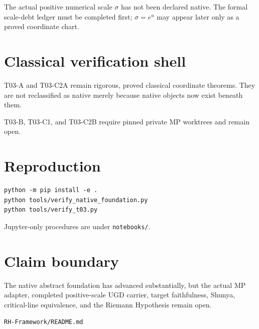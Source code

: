 The actual positive numerical scale \(\sigma\) has not been declared native.
The formal scale-debt ledger must be completed first; \(\sigma=e^u\) may appear
later only as a proved coordinate chart.

\hypertarget{classical-verification-shell}{%
\section{Classical verification shell}\label{classical-verification-shell}}

T03-A and T03-C2A remain rigorous, proved classical coordinate theorems. They
are not reclassified as native merely because native objects now exist beneath
them.

T03-B, T03-C1, and T03-C2B require pinned private MP worktrees and remain open.

\hypertarget{reproduction}{%
\section{Reproduction}\label{reproduction}}

\begin{verbatim}
python -m pip install -e .
python tools/verify_native_foundation.py
python tools/verify_t03.py
\end{verbatim}

Jupyter-only procedures are under \texttt{notebooks/}.

\hypertarget{claim-boundary}{%
\section{Claim boundary}\label{claim-boundary}}

The native abstract foundation has advanced substantially, but the actual MP
adapter, completed positive-scale UGD carrier, target faithfulness, Shunya,
critical-line equivalence, and the Riemann Hypothesis remain open.

\begin{flushright}\small\texttt{RH-Framework/README.md}\end{flushright}
